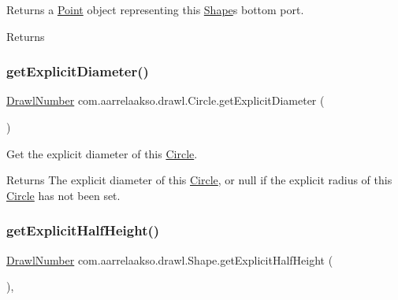 Returns a \hyperlink{classcom_1_1aarrelaakso_1_1drawl_1_1_point}{Point} object representing this \hyperlink{classcom_1_1aarrelaakso_1_1drawl_1_1_shape}{Shape}\textquotesingle{}s bottom port. 

\begin{DoxyReturn}{Returns}

\end{DoxyReturn}
\mbox{\label{classcom_1_1aarrelaakso_1_1drawl_1_1_circle_ab1971c353febd9bc5f5633e9b6e5611e}} 
\subsubsection{\texorpdfstring{get\+Explicit\+Diameter()}{getExplicitDiameter()}}
{\footnotesize\ttfamily \hyperlink{classcom_1_1aarrelaakso_1_1drawl_1_1_drawl_number}{Drawl\+Number} com.\+aarrelaakso.\+drawl.\+Circle.\+get\+Explicit\+Diameter (\begin{DoxyParamCaption}{ }\end{DoxyParamCaption})\hspace{0.3cm}{\ttfamily [private]}}



Get the explicit diameter of this \hyperlink{classcom_1_1aarrelaakso_1_1drawl_1_1_circle}{Circle}. 

\begin{DoxyReturn}{Returns}
The explicit diameter of this \hyperlink{classcom_1_1aarrelaakso_1_1drawl_1_1_circle}{Circle}, or {\ttfamily null} if the explicit radius of this \hyperlink{classcom_1_1aarrelaakso_1_1drawl_1_1_circle}{Circle} has not been set. 
\end{DoxyReturn}
\mbox{\label{classcom_1_1aarrelaakso_1_1drawl_1_1_shape_a7207aa8ba07ed18af81fb9d92a979cd6}} 
\subsubsection{\texorpdfstring{get\+Explicit\+Half\+Height()}{getExplicitHalfHeight()}}
{\footnotesize\ttfamily \hyperlink{classcom_1_1aarrelaakso_1_1drawl_1_1_drawl_number}{Drawl\+Number} com.\+aarrelaakso.\+drawl.\+Shape.\+get\+Explicit\+Half\+Height (\begin{DoxyParamCaption}{ }\end{DoxyParamCaption})\hspace{0.3cm}{\ttfamily [protected]}, {\ttfamily [inherited]}}



